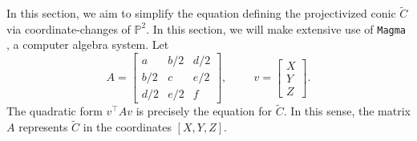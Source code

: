 \documentclass[10pt,a4paper]{amsart}
\numberwithin{equation}{section}
\numberwithin{figure}{section}
\numberwithin{table}{section}
\theoremstyle{definition}
\theoremstyle{plain}
\theoremstyle{remark}
\theoremstyle{plain}
\theoremstyle{definition}
\theoremstyle{plain}
\theoremstyle{plain}
\renewcommand{\P}{\mathbb{P}}
\newcommand{\trsp}[1]{{{#1}^{\top}\!\!}}
\begin{document}
	In this section, we aim to simplify the equation defining the projectivized conic $\widetilde{C}$ via coordinate-changes of $\P^2$. In this section,
	we will make extensive use of \texttt{Magma} \cite{magma}, a computer 
	algebra system. Let
	\begin{equation*}
	A=\begin{bmatrix}
	a&b/2&d/2\\
	b/2&c&e/2\\
	d/2&e/2&f
	\end{bmatrix}, \hspace{1cm}
	v = \begin{bmatrix}
	X\\
	Y\\
	Z
	\end{bmatrix}.
	\end{equation*}
	The quadratic form $\trsp{v} A v$ is precisely the equation for $\widetilde{C}$. In this sense, the matrix $A$ represents $\widetilde{C}$ in the coordinates $[X,Y,Z]$.
	
\end{document}

